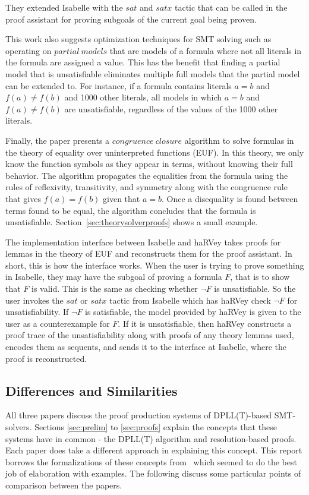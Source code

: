 \documentclass{article}
\begin{document}
They extended Isabelle with the $sat$ and $satx$ tactic
that can be called in the proof assistant for 
proving subgoals of the current goal being proven.
 
This work also suggests optimization techniques 
for SMT solving such as operating on $partial\  
models$ that are models of a formula where not all 
literals in the formula are assigned a value. This has 
the benefit that finding a partial model that is 
unsatisfiable eliminates multiple full models that the 
partial model can be extended to. For instance, if 
a formula contains literals $a = b$ and 
$f(a) \neq f(b)$ and 1000 other literals, all models 
in which $a = b$ and $f(a) \neq f(b)$ are unsatisfiable, 
regardless of the values of the 1000 other literals.

Finally, the paper presents a $congruence\ closure$ 
algorithm to solve formulas in the theory of 
equality over uninterpreted functions (EUF). In 
this theory, we only know the function symbols 
as they appear in terms, without knowing their 
full behavior. The algorithm propagates the equalities
from the formula using the rules of reflexivity, 
transitivity, and symmetry along with the congruence rule
that gives $f(a) = f(b)$ given that $a = b$. Once a 
disequality is found between terms found to be equal, 
the algorithm concludes that the formula is unsatisfiable.
Section~\ref{sec:theorysolverproofs} shows a small 
example.

The implementation interface between Isabelle and haRVey 
takes proofs for lemmas in the theory of EUF and 
reconstructs them for the proof assistant. In short,
this is how the interface works. When the user is trying 
to prove something in Isabelle, they may have the 
subgoal of proving a formula $F$, that is to show that 
$F$ is valid. This is the same as checking whether 
$\neg F$ is unsatisfiable. So the user invokes the $sat$ 
or $satx$ tactic from Isabelle which has haRVey check 
$\neg F$ for unsatisfiability. If $\neg F$ is 
satisfiable, the model provided by haRVey is given 
to the user as a counterexample for $F$. 
If it is unsatisfiable, then haRVey constructs a proof
trace of the unsatisfiability along with proofs of 
any theory lemmas used, encodes them as sequents,
and sends it to the interface at Isabelle, 
where the proof is reconstructed.

\subsection{Differences and Similarities}
All three papers discuss the proof production systems of 
DPLL(T)-based SMT-solvers. Sections \ref{sec:prelim} to 
\ref{sec:proofs} explain the concepts that 
these systems have in common - the DPLL(T) algorithm and 
resolution-based proofs. Each paper does take a different
approach in explaining this concept. This report borrows 
the formalizations of these concepts 
from~\cite{DBLP:conf/fmcad/KatzBTRH16} which seemed to 
do the best job of elaboration with examples. The following
discuss some particular points of comparison between the 
papers.
\end{document}
